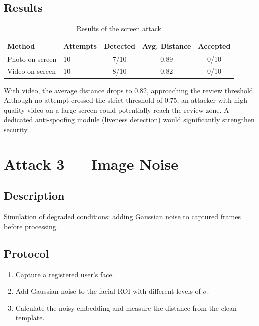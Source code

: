 \subsection{Results}

\begin{table}[H]
    \centering
    \begin{tabular}{llccc}
        \toprule
        \textbf{Method} & \textbf{Attempts} & \textbf{Detected} & \textbf{Avg. Distance} & \textbf{Accepted} \\
        \midrule
        Photo on screen  & 10 & 7/10  & 0.89 & 0/10 \\
        Video on screen  & 10 & 8/10  & 0.82 & 0/10 \\
        \bottomrule
    \end{tabular}
    \caption{Results of the screen attack}
\end{table}

\begin{warnbox}
With video, the average distance drops to 0.82, approaching the review threshold. Although no attempt crossed the strict threshold of 0.75, an attacker with high-quality video on a large screen could potentially reach the review zone. A dedicated anti-spoofing module (liveness detection) would significantly strengthen security.
\end{warnbox}


\section{Attack 3 — Image Noise}

\subsection{Description}

Simulation of degraded conditions: adding Gaussian noise to captured frames before processing.

\subsection{Protocol}

\begin{enumerate}
    \item Capture a registered user's face.
    \item Add Gaussian noise to the facial ROI with different levels of $\sigma$.
    \item Calculate the noisy embedding and measure the distance from the clean template.
\end{enumerate}

